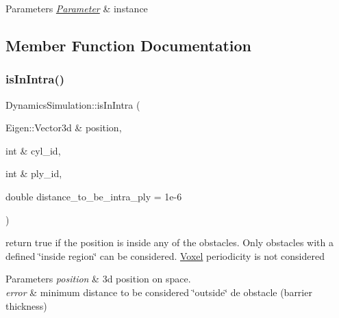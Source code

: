 \begin{DoxyParams}{Parameters}
{\em \hyperlink{class_parameter}{Parameter}} & instance \\
\hline
\end{DoxyParams}


\subsection{Member Function Documentation}
\mbox{\label{class_dynamics_simulation_ae7aa76c335aceb658a4ffc683898077c}} 
\subsubsection{\texorpdfstring{is\+In\+Intra()}{isInIntra()}}
{\footnotesize\ttfamily Dynamics\+Simulation\+::is\+In\+Intra (\begin{DoxyParamCaption}\item[{Eigen\+::\+Vector3d \&}]{position,  }\item[{int \&}]{cyl\+\_\+id,  }\item[{int \&}]{ply\+\_\+id,  }\item[{double}]{distance\+\_\+to\+\_\+be\+\_\+intra\+\_\+ply = {\ttfamily 1e-\/6} }\end{DoxyParamCaption})}



return true if the position is inside any of the obstacles. Only obstacles with a defined \char`\"{}inside region\char`\"{} can be considered. \hyperlink{class_voxel}{Voxel} periodicity is not considered 


\begin{DoxyParams}{Parameters}
{\em position} & 3d position on space. \\
\hline
{\em error} & minimum distance to be considered \char`\"{}outside\char`\"{} de obstacle (barrier thickness) \\
\hline
\end{DoxyParams}
\mbox{\label{class_dynamics_simulation_a67adab75eba635447c1b1b2b26d1e0ab}} 
